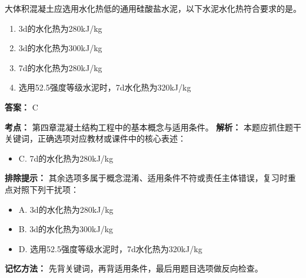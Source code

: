 \documentclass[UTF8,fontset=fandol,11pt]{ctexart}
\begin{document}
\vspace{0.2em}

\begin{quizbox}[title={第 85 题}]
大体积混凝土应选用水化热低的通用硅酸盐水泥，以下水泥水化热符合要求的是。\\
\begin{enumerate}[label=\Alph*.]
\item 3d的水化热为280kJ/kg
\item 3d的水化热为300kJ/kg
\item 7d的水化热为280kJ/kg
\item 选用52.5强度等级水泥时，7d水化热为320kJ/kg
\end{enumerate}
\textbf{答案：} C
\vspace{0.25em}
\begin{answerbox}[title={考点解析}]
\textbf{考点：} 第四章混凝土结构工程中的基本概念与适用条件。
\textbf{解析：} 本题应抓住题干关键词，正确选项对应教材或课件中的核心表述：
\begin{itemize}
\item C. 7d的水化热为280kJ/kg
\end{itemize}
\textbf{排除提示：} 其余选项多属于概念混淆、适用条件不符或责任主体错误，复习时重点对照下列干扰项：
\begin{itemize}
\item A. 3d的水化热为280kJ/kg
\item B. 3d的水化热为300kJ/kg
\item D. 选用52.5强度等级水泥时，7d水化热为320kJ/kg
\end{itemize}
\textbf{记忆方法：} 先背关键词，再背适用条件，最后用题目选项做反向检查。
\end{answerbox}
\end{quizbox}

\vspace{0.2em}
\end{document}
